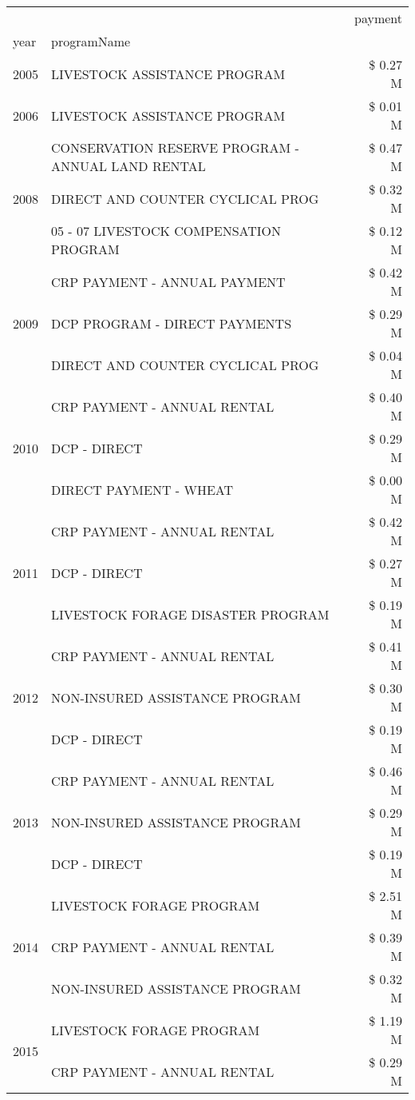 \begin{tabular}{llr}
\toprule
 &  & payment \\
year & programName &  \\
\midrule
2005 & LIVESTOCK ASSISTANCE PROGRAM & \$ 0.27 M \\
\cline{1-3}
2006 & LIVESTOCK ASSISTANCE PROGRAM & \$ 0.01 M \\
\cline{1-3}
\multirow[t]{3}{*}{2008} & CONSERVATION RESERVE PROGRAM - ANNUAL LAND RENTAL & \$ 0.47 M \\
 & DIRECT AND COUNTER CYCLICAL PROG & \$ 0.32 M \\
 & 05 - 07 LIVESTOCK COMPENSATION PROGRAM & \$ 0.12 M \\
\cline{1-3}
\multirow[t]{3}{*}{2009} & CRP PAYMENT - ANNUAL PAYMENT & \$ 0.42 M \\
 & DCP PROGRAM - DIRECT PAYMENTS & \$ 0.29 M \\
 & DIRECT AND COUNTER CYCLICAL PROG & \$ 0.04 M \\
\cline{1-3}
\multirow[t]{3}{*}{2010} & CRP PAYMENT - ANNUAL RENTAL & \$ 0.40 M \\
 & DCP - DIRECT & \$ 0.29 M \\
 & DIRECT PAYMENT - WHEAT & \$ 0.00 M \\
\cline{1-3}
\multirow[t]{3}{*}{2011} & CRP PAYMENT - ANNUAL RENTAL & \$ 0.42 M \\
 & DCP - DIRECT & \$ 0.27 M \\
 & LIVESTOCK FORAGE DISASTER PROGRAM & \$ 0.19 M \\
\cline{1-3}
\multirow[t]{3}{*}{2012} & CRP PAYMENT - ANNUAL RENTAL & \$ 0.41 M \\
 & NON-INSURED ASSISTANCE PROGRAM & \$ 0.30 M \\
 & DCP - DIRECT & \$ 0.19 M \\
\cline{1-3}
\multirow[t]{3}{*}{2013} & CRP PAYMENT - ANNUAL RENTAL & \$ 0.46 M \\
 & NON-INSURED ASSISTANCE PROGRAM & \$ 0.29 M \\
 & DCP - DIRECT & \$ 0.19 M \\
\cline{1-3}
\multirow[t]{3}{*}{2014} & LIVESTOCK FORAGE PROGRAM & \$ 2.51 M \\
 & CRP PAYMENT - ANNUAL RENTAL & \$ 0.39 M \\
 & NON-INSURED ASSISTANCE PROGRAM & \$ 0.32 M \\
\cline{1-3}
\multirow[t]{3}{*}{2015} & LIVESTOCK FORAGE PROGRAM & \$ 1.19 M \\
 & CRP PAYMENT - ANNUAL RENTAL & \$ 0.29 M \\

\end{tabular}
